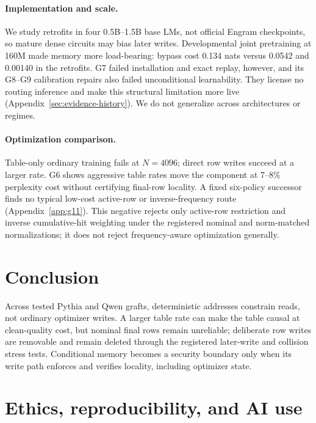 \documentclass{article}
\begin{document}
\paragraph{Implementation and scale.}
We study retrofits in four 0.5B--1.5B base LMs, not official Engram checkpoints,
so mature dense circuits may bias later writes. Developmental joint pretraining
at 160M made memory more load-bearing: bypass cost 0.134 nats versus 0.0542 and
0.00140 in the retrofits. G7 failed installation and exact replay, however, and
its G8--G9 calibration repairs also failed unconditional learnability. They
license no routing inference and make this structural limitation more live
(Appendix~\ref{sec:evidence-history}). We do not generalize across architectures
or regimes.

\paragraph{Optimization comparison.}
Table-only ordinary training fails at $N=4096$; direct row writes succeed at a
larger rate. G6 shows aggressive table rates move the component at 7--8\%
perplexity cost without certifying final-row locality. A fixed six-policy
successor finds no typical low-cost active-row or inverse-frequency route
(Appendix~\ref{app:g11}). This negative rejects only active-row restriction and
inverse cumulative-hit weighting under the registered nominal and norm-matched
normalizations; it does not reject frequency-aware optimization generally.

\section{Conclusion}

Across tested Pythia and Qwen grafts, deterministic addresses constrain reads,
not ordinary optimizer writes. A larger table rate can make the table causal at
clean-quality cost, but nominal final rows remain unreliable; deliberate row
writes are removable and remain deleted through the registered later-write and
collision stress tests. Conditional memory becomes a security boundary only
when its write path enforces and verifies locality, including optimizer state.




\appendix
\small

\section{Ethics, reproducibility, and AI use}
\end{document}

